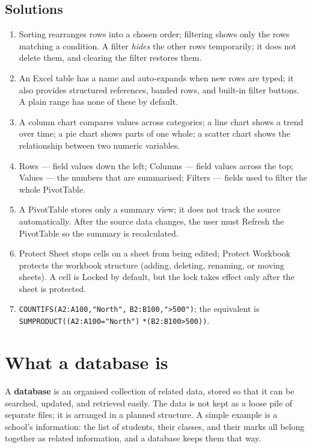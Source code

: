 \subsection*{Solutions}
\begingroup\small
\begin{enumerate}[label=\arabic*.]
  \item Sorting rearranges rows into a chosen order; filtering shows only the
    rows matching a condition. A filter \emph{hides} the other rows temporarily;
    it does not delete them, and clearing the filter restores them.
  \item An Excel table has a name and auto-expands when new rows are typed; it
    also provides structured references, banded rows, and built-in filter
    buttons. A plain range has none of these by default.
  \item A column chart compares values across categories; a line chart shows a
    trend over time; a pie chart shows parts of one whole; a scatter chart shows
    the relationship between two numeric variables.
  \item Rows --- field values down the left; Columns --- field values across the
    top; Values --- the numbers that are summarised; Filters --- fields used to
    filter the whole PivotTable.
  \item A PivotTable stores only a summary view; it does not track the source
    automatically. After the source data changes, the user must Refresh the
    PivotTable so the summary is recalculated.
  \item Protect Sheet stops cells on a sheet from being edited; Protect Workbook
    protects the workbook structure (adding, deleting, renaming, or moving
    sheets). A cell is Locked by default, but the lock takes effect only after
    the sheet is protected.
  \item \texttt{COUNTIFS(A2:A100,"North",} \texttt{B2:B100,">500")}; the
    equivalent is \texttt{SUMPRODUCT((A2:A100="North")}
    \texttt{*(B2:B100>500))}.
\end{enumerate}
\endgroup

\section{What a database is}
A \textbf{database} is an organised collection of related data, stored so
that it can be searched, updated, and retrieved easily. The data is not kept
as a loose pile of separate files; it is arranged in a planned structure.
A simple example is a school's information: the list of students, their
classes, and their marks all belong together as related information, and a
database keeps them that way.

